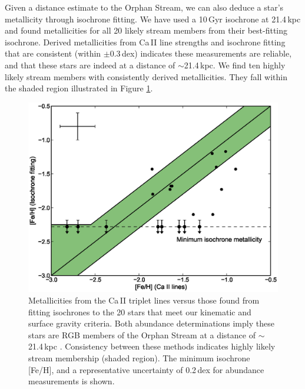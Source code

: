 \documentclass[10pt,apjl]{emulateapj}
\begin{document}
Given a distance estimate to the Orphan Stream, we can also deduce a star's metallicity through isochrone fitting. We have used a 10\,Gyr \citet{Girardi_et-al_2008} isochrone at 21.4\,kpc \citep{Newberg_et-al_2010} and found metallicities for all 20 likely stream members from their best-fitting isochrone. Derived metallicities from Ca\,\textsc{II} line strengths and isochrone fitting that are consistent (within $\pm0.3$\,dex) indicates these measurements are reliable, and that these stars are indeed at a distance of $\sim$21.4\,kpc. We find ten highly likely stream members with consistently derived metallicities. They fall within the shaded region illustrated in Figure \ref{fig:feh}. 

\begin{figure}[t!]
	\includegraphics[width=\columnwidth]{./fig3.eps}
	\caption{Metallicities from the Ca\,\textsc{II} triplet lines versus those found from fitting isochrones to the 20 stars that meet our kinematic and surface gravity criteria. Both abundance determinations imply these stars are RGB members of the Orphan Stream at a distance of $\sim$21.4\,kpc \citep{Newberg_et-al_2010}. Consistency between these methods indicates highly likely stream membership (shaded region). The minimum isochrone [Fe/H], and a representative uncertainty of 0.2\,dex for abundance measurements is shown.}
	\label{fig:feh}
\end{figure}
\end{document}
